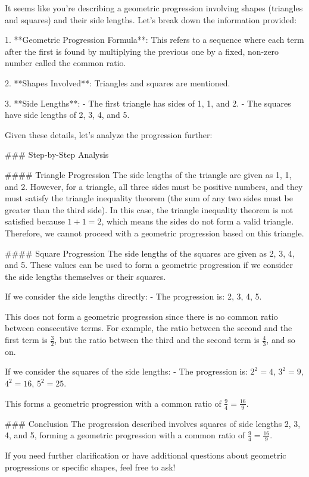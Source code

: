It seems like you're describing a geometric progression involving shapes (triangles and squares) and their side lengths. Let's break down the information provided:

1. **Geometric Progression Formula**: This refers to a sequence where each term after the first is found by multiplying the previous one by a fixed, non-zero number called the common ratio.
   
2. **Shapes Involved**: Triangles and squares are mentioned.

3. **Side Lengths**:
   - The first triangle has sides of 1, 1, and 2.
   - The squares have side lengths of 2, 3, 4, and 5.

Given these details, let's analyze the progression further:

### Step-by-Step Analysis

#### Triangle Progression
The side lengths of the triangle are given as 1, 1, and 2. However, for a triangle, all three sides must be positive numbers, and they must satisfy the triangle inequality theorem (the sum of any two sides must be greater than the third side). In this case, the triangle inequality theorem is not satisfied because \(1 + 1 = 2\), which means the sides do not form a valid triangle. Therefore, we cannot proceed with a geometric progression based on this triangle.

#### Square Progression
The side lengths of the squares are given as 2, 3, 4, and 5. These values can be used to form a geometric progression if we consider the side lengths themselves or their squares.

If we consider the side lengths directly:
- The progression is: 2, 3, 4, 5.

This does not form a geometric progression since there is no common ratio between consecutive terms. For example, the ratio between the second and the first term is \(\frac{3}{2}\), but the ratio between the third and the second term is \(\frac{4}{3}\), and so on.

If we consider the squares of the side lengths:
- The progression is: \(2^2 = 4\), \(3^2 = 9\), \(4^2 = 16\), \(5^2 = 25\).

This forms a geometric progression with a common ratio of \(\frac{9}{4} = \frac{16}{9}\).

### Conclusion
The progression described involves squares of side lengths 2, 3, 4, and 5, forming a geometric progression with a common ratio of \(\frac{9}{4} = \frac{16}{9}\).

If you need further clarification or have additional questions about geometric progressions or specific shapes, feel free to ask!